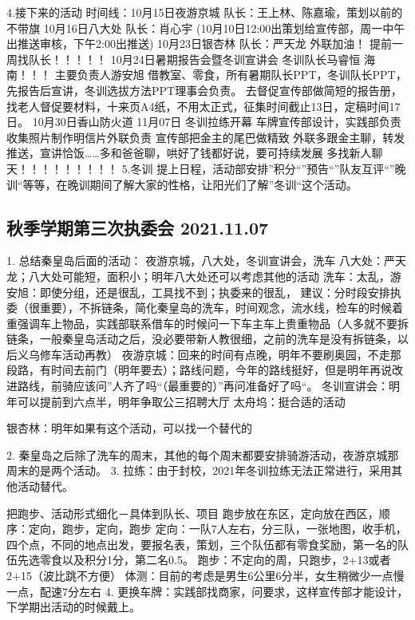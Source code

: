 \documentclass{ctexbook}
\begin{document}
4.接下来的活动 时间线：10月15日夜游京城  队长：王上林、陈嘉瑜，策划以前的    不带旗         10月16日八大处  队长：肖心宇             (10月10日12:00出策划给宣传部，周一中午出推送审核，下午2:00出推送) 10月23日银杏林 队长：严天龙  外联加油！   提前一周找队长！！！！！ 10月24日暑期报告会暨冬训宣讲会 冬训队长马睿恒  海南！！！     主要负责人游安旭 借教室、零食，所有暑期队长PPT，冬训队长PPT，先报告后宣讲，冬训选拔方法PPT理事会负责。     去督促宣传部做简短的报告册，找老人督促要材料，十来页A4纸，不用太正式，征集时间截止13日，定稿时间17日。 10月30日香山防火道  11月07日 冬训拉练开幕  车牌宣传部设计，实践部负责 收集照片制作明信片外联负责 宣传部把金主的尾巴做精致 外联多跟金主聊，转发推送，宣讲恰饭……多和爸爸聊，哄好了钱都好说，要可持续发展 多找新人聊天！！！！！！！！！  5.冬训 提上日程，活动部安排''积分``''预告``''队友互评``''晚训``等等，在晚训期间了解大家的性格，让阳光们了解''冬训``这个活动。 
\subsection{秋季学期第三次执委会 2021.11.07}
1. 总结秦皇岛后面的活动：
夜游京城，八大处，冬训宣讲会，洗车 八大处：严天龙；八大处可能短，面积小；明年八大处还可以考虑其他的活动 洗车：太乱，游安旭：即使分组，还是很乱，工具找不到；执委来的很乱， 建议：分时段安排执委（很重要），不拆链条，简化秦皇岛的洗车，时间观念，流水线，检车的时候着重强调车上物品，实践部联系借车的时候问一下车主车上贵重物品（人多就不要拆链条，一般秦皇岛活动之后，没必要带新人教很细，之前的洗车是没有拆链条，以后义乌修车活动再教）  夜游京城：回来的时间有点晚，明年不要刷奥园，不走那段路，有时间去前门（明年要去）；路线问题，今年的路线挺好，但是明年再说改进路线，前骑应该问''人齐了吗``（最重要的）''再问准备好了吗``。  冬训宣讲会：明年可以提前到六点半，明年争取公三招聘大厅  太舟坞：挺合适的活动 

银杏林：明年如果有这个活动，可以找一个替代的 

2. 秦皇岛之后除了洗车的周末，其他的每个周末都要安排骑游活动，夜游京城那周末的是两个活动。 3. 拉练：由于封校，2021年冬训拉练无法正常进行，采用其他活动替代。

把跑步、活动形式细化－具体到队长、项目 跑步放在东区，定向放在西区，顺序：定向，跑步，定向，跑步 定向：一队7人左右，分三队，一张地图，收手机，四个点，不同的地点出发，要报名表，策划，三个队伍都有零食奖励，第一名的队伍先选零食以及积分1分，第二名0.5。 跑步：不定向的周，只跑步，2+13或者2+15（波比跳不方便） 体测：目前的考虑是男生6公里6分半，女生稍微少一点慢一点，配速7分左右 4. 更换车牌：实践部找商家，问要求，这样宣传部才能设计，下学期出活动的时候戴上。
 
\end{document}
